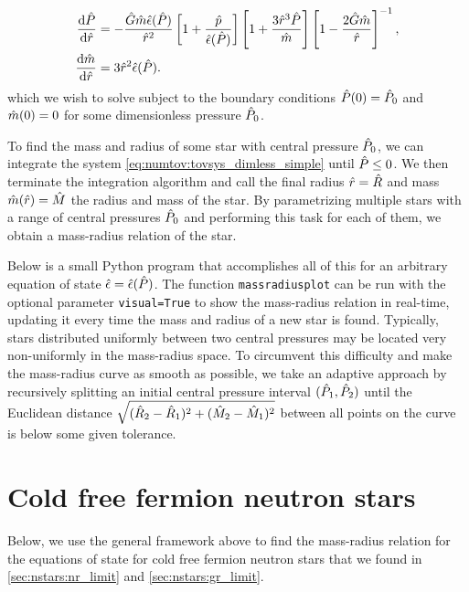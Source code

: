 \begin{subequations}
\label{eq:numtov:tovsys_dimless_simple}
\begin{align}
	\odv{\diml{P}}{\diml{r}} &= - \frac{\diml{G} \diml{m} \diml{\epsilon}(\diml{P})}{\diml{r}^2} \left[ 1 + \frac{\diml{p}}{\diml{\epsilon}(\diml{P})} \right] \left[ 1 + \frac{3 \diml{r}^3 \diml{P}}{\diml{m}} \right] \left[ 1 - \frac{2 \diml{G} \diml{m}}{\diml{r}} \right]^{-1} , \\
	\odv{\diml{m}}{\diml{r}} &= 3 \diml{r}^2 \diml{\epsilon}(\diml{P}) .
\end{align}
\end{subequations}
which we wish to solve subject to the boundary conditions $\hat{P}(0) = \hat{P}_0$ and $\hat{m}(0) = 0$ for some dimensionless pressure $\hat{P}_0$.

To find the mass and radius of some star with central pressure $\hat{P}_0$, we can integrate the system \eqref{eq:numtov:tovsys_dimless_simple} until $\hat{P} \le 0$.
We then terminate the integration algorithm and call the final radius $\hat{r} = \hat{R}$ and mass $\hat{m}(\hat{r}) = \hat{M}$ the radius and mass of the star.
By parametrizing multiple stars with a range of central pressures $\hat{P}_0$ and performing this task for each of them, we obtain a mass-radius relation of the star.

Below is a small Python program that accomplishes all of this for an arbitrary equation of state $\hat{\epsilon} = \hat{\epsilon}(\hat{P})$.
The function \verb|massradiusplot|  can be run with the optional parameter \verb|visual=True| to show the mass-radius relation in real-time, updating it every time the mass and radius of a new star is found.
Typically, stars distributed uniformly between two central pressures may be located very non-uniformly in the mass-radius space.
To circumvent this difficulty and make the mass-radius curve as smooth as possible, we take an adaptive approach by recursively splitting an initial central pressure interval $(\hat{P}_1, \hat{P}_2)$ until the Euclidean distance $\sqrt{(\hat{R}_2-\hat{R}_1)^2 + (\hat{M}_2-\hat{M}_1)^2}$ between all points on the curve is below some given tolerance.


\section{Cold free fermion neutron stars}

Below, we use the general framework above to find the mass-radius relation for the equations of state for cold free fermion neutron stars that we found in \cref{sec:nstars:nr_limit} and \cref{sec:nstars:gr_limit}.

